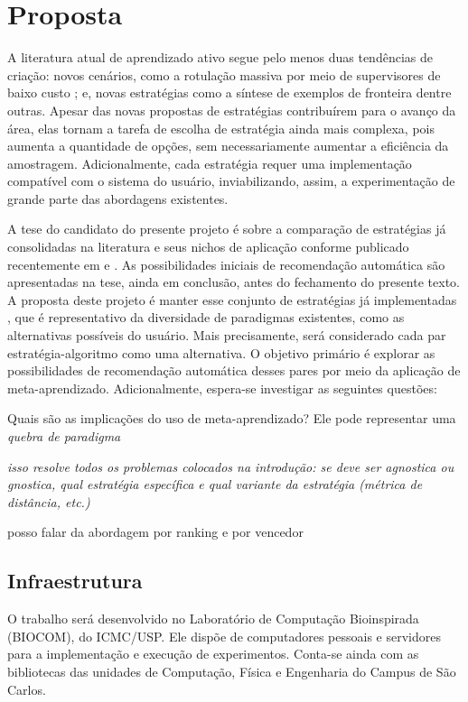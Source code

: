 \section{Proposta}\label{pr}
A literatura atual de aprendizado ativo segue pelo menos duas tendências de criação:
novos cenários, como a rotulação massiva por meio de supervisores de baixo custo \citep{journals/ijcv/VijayanarasimhanG14};
e, novas estratégias como a síntese de exemplos de fronteira \citep{journals/ijon/WangHYL15}
dentre outras.
Apesar das novas propostas de estratégias contribuírem para o avanço da área,
elas tornam a tarefa de escolha de estratégia ainda mais complexa,
pois aumenta a quantidade de opções, sem necessariamente aumentar a eficiência
da amostragem.
Adicionalmente, cada estratégia requer uma implementação compatível com o sistema do usuário,
inviabilizando, assim, a experimentação de grande parte das abordagens existentes.

A tese do candidato do presente projeto é sobre a comparação de estratégias já
consolidadas na literatura e seus nichos de aplicação conforme publicado recentemente
em \cite{santos2014viabilidade} e \cite{conf/hais/SantosC14}.
As possibilidades iniciais de recomendação automática são apresentadas na tese,
ainda em conclusão, antes do fechamento do presente texto.
A proposta deste projeto é manter esse conjunto de estratégias já implementadas
\citep{doi/al}, que é representativo da diversidade de paradigmas existentes, 
como as alternativas possíveis do usuário.
Mais precisamente, será considerado cada par estratégia-algoritmo como
uma alternativa.
O objetivo primário é explorar as possibilidades de recomendação automática
desses pares por meio da aplicação de meta-aprendizado.
Adicionalmente, espera-se investigar as seguintes questões:
\begin{compactenum}
\item{Quais são as implicações do uso de meta-aprendizado?
Ele pode representar uma \textit{quebra de paradigma}

\textit{isso resolve todos os problemas colocados na introdução: se deve ser agnostica ou gnostica, qual estratégia
específica
e qual variante da estratégia (métrica de distância, etc.)}

posso falar da abordagem por
ranking e por vencedor
}
\end{compactenum}

\subsection{Infraestrutura}
O trabalho será desenvolvido no Laboratório de Computação Bioinspirada (BIOCOM),
do ICMC/USP.
Ele dispõe de computadores pessoais e servidores para a implementação
e execução de experimentos.
Conta-se ainda com as bibliotecas
das unidades de Computação, Física e Engenharia do Campus de São Carlos.

